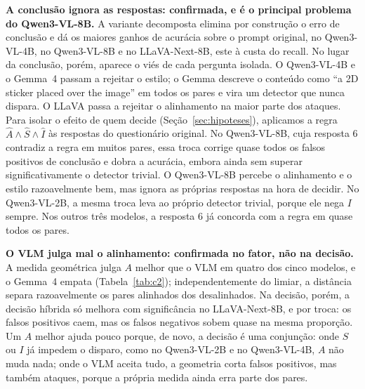 \documentclass[conference]{IEEEtran}
\begin{document}
\textbf{A conclusão ignora as respostas: confirmada, e é o principal problema do Qwen3-VL-8B.} A variante
decomposta elimina por construção o erro de conclusão e dá os maiores ganhos de acurácia sobre o prompt
original, no Qwen3-VL-4B, no Qwen3-VL-8B e no LLaVA-Next-8B, este à custa do recall. No lugar da
conclusão, porém, aparece o viés de cada pergunta isolada. O Qwen3-VL-4B e o Gemma~4 passam a rejeitar o
estilo; o Gemma descreve o conteúdo como ``a 2D sticker placed over the image'' em todos os pares e vira
um detector que nunca dispara. O LLaVA passa a rejeitar o alinhamento na maior parte dos ataques. Para
isolar o efeito de quem decide (Seção~\ref{sec:hipoteses}), aplicamos a regra
$\hat A\wedge\hat S\wedge\hat I$ às respostas do questionário original. No Qwen3-VL-8B, cuja resposta 6
contradiz a regra em muitos pares, essa troca corrige quase todos os falsos positivos de conclusão e
dobra a acurácia, embora ainda sem superar significativamente o detector trivial. O Qwen3-VL-8B
percebe o alinhamento e o estilo razoavelmente bem, mas ignora as próprias respostas na hora de decidir.
No Qwen3-VL-2B, a mesma troca leva ao próprio detector trivial, porque ele nega $I$ sempre. Nos outros
três modelos, a resposta 6 já concorda com a regra em quase todos os pares.

\textbf{O VLM julga mal o alinhamento: confirmada no fator, não na decisão.} A medida geométrica julga
$A$ melhor que o VLM em quatro dos cinco modelos, e o Gemma~4 empata (Tabela~\ref{tab:c2});
independentemente do limiar, a distância separa razoavelmente os pares alinhados dos desalinhados. Na
decisão, porém, a decisão híbrida só melhora com significância no LLaVA-Next-8B, e por troca: os falsos
positivos caem, mas os falsos negativos sobem quase na mesma proporção. Um $A$ melhor ajuda pouco porque, de novo, a decisão é uma
conjunção: onde $S$ ou $I$ já impedem o disparo, como no Qwen3-VL-2B e no Qwen3-VL-4B, $A$ não muda nada;
onde o VLM aceita tudo, a geometria corta falsos positivos, mas também ataques, porque a própria medida
ainda erra parte dos pares.
\end{document}
